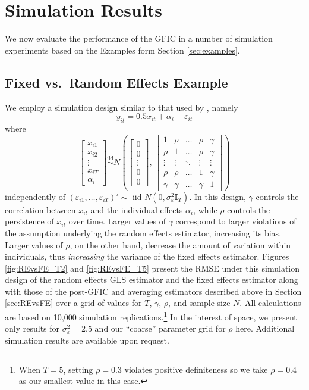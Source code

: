 \section{Simulation Results}
\label{sec:simulation}
We now evaluate the performance of the GFIC in a number of simulation experiments based on the Examples form Section \ref{sec:examples}.

\subsection{Fixed vs.\ Random Effects Example}
We employ a simulation design similar to that used by \cite{GuggenbergerRE}, namely
\begin{equation*}
  y_{it} = 0.5 x_{it} + \alpha_i + \varepsilon_{it}
\end{equation*}
where
\[
  \begin{bmatrix}
x_{i1}\\
x_{i2}\\
\vdots\\
x_{iT}\\
\alpha_i
\end{bmatrix}  \overset{\mbox{iid}}{\sim} N \left (
\begin{bmatrix}
0\\
0\\
\vdots\\
0\\
0
\end{bmatrix} , \, 
\begin{bmatrix}
1 & \rho & \ldots & \rho & \gamma\\
\rho & 1 & \ldots & \rho & \gamma\\
\vdots & \vdots&  \ddots & \vdots &\vdots\\
\rho & \rho & \ldots & 1 & \gamma\\
\gamma& \gamma &\ldots& \gamma & 1 
\end{bmatrix}
\right)
\]
independently of $\left( \varepsilon_{i1}, \dots, \varepsilon_{iT} \right)' \sim \mbox{ iid } N(0, \sigma_{\varepsilon}^2 \mathbf{I}_T)$.
In this design, $\gamma$ controls the correlation between $x_{it}$ and the individual effects $\alpha_i$, while $\rho$ controls the persistence of $x_{it}$ over time.
Larger values of $\gamma$ correspond to larger violations of the assumption underlying the random effects estimator, increasing its bias.
Larger values of $\rho$, on the other hand, decrease the amount of variation within individuals, thus \emph{increasing} the variance of the fixed effects estimator. 
Figures \ref{fig:REvsFE_T2} and \ref{fig:REvsFE_T5} present the RMSE under this simulation design of the random effects GLS estimator and the fixed effects estimator along with those of the post-GFIC and averaging estimators described above in Section \ref{sec:REvsFE} over a grid of values for $T$, $\gamma$, $\rho$, and sample size $N$.
All calculations are based on 10,000 simulation replications.\footnote{When $T=5$, setting $\rho = 0.3$ violates positive definiteness so we take $\rho=0.4$ as our smallest value in this case.} In the interest of space, we present only results for $\sigma_{\varepsilon}^2 = 2.5$ and our ``coarse'' parameter grid for $\rho$ here. 
Additional simulation results are available upon request.
 

